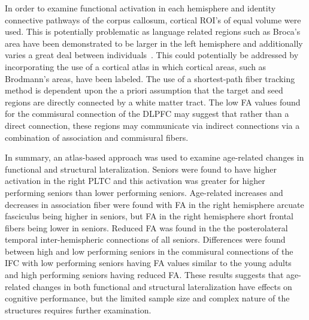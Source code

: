 In order to examine functional activation in each hemisphere and identity connective pathways of the corpus callosum, cortical ROI's of equal volume were used. This is potentially problematic as language related regions such as Broca's area have been demonstrated to be larger in the left hemisphere and additionally varies a great deal between individuals~\cite{Galaburda1995}. This could potentially be addressed by incorporating the use of a cortical atlas in which cortical areas, such as Brodmann's areas, have been labeled. The use of a shortest-path fiber tracking method is dependent upon the a priori assumption that the target and seed regions are directly connected by a white matter tract. The low FA values found for the commisural connection of the DLPFC may suggest that rather than a direct connection, these regions may communicate via indirect connections via a combination of association and commisural fibers. 

In summary, an atlas-based approach was used to examine age-related changes in functional and structural lateralization. Seniors were found to have higher activation in the right PLTC and this activation was greater for higher performing seniors than lower performing seniors. Age-related increases and decreases in association fiber were found with FA in the right hemisphere arcuate fasciculus being higher in seniors, but FA in the right hemisphere short frontal fibers being lower in seniors. Reduced FA was found in the the posterolateral temporal inter-hemispheric connections of all seniors. Differences were found between high and low performing seniors in the commisural connections of the IFC with low performing seniors having FA values similar to the young adults and high performing seniors having reduced FA. These results suggests that age-related changes in both functional and structural lateralization have effects on cognitive performance, but the limited sample size and complex nature of the structures requires further examination.








